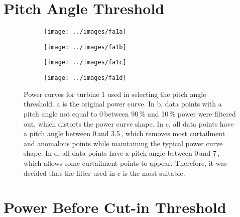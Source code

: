\chapter{Pitch Angle Threshold}\label{a1}

\begin{figure}
  \centering
  \begin{subfigure}[t]{.5\textwidth}
    \centering
    \texttt{[image: ../images/fa1a]}
    \caption{}
  \end{subfigure}
  \begin{subfigure}[t]{.5\textwidth}
    \centering
    \texttt{[image: ../images/fa1b]}
    \caption{}
  \end{subfigure}
  \begin{subfigure}[t]{.49\textwidth}
    \centering
    \texttt{[image: ../images/fa1c]}
    \caption{}
  \end{subfigure}
  \begin{subfigure}[t]{.49\textwidth}
    \centering
    \texttt{[image: ../images/fa1d]}
    \caption{}
  \end{subfigure}
  \captionsetup{labelformat=empty,list=no}
  \caption{Power curves for turbine 1 used in selecting the pitch angle
  threshold. a is the original power curve. In b, data points with a pitch
  angle not equal to 0\,\textdegree between 90\,\% and 10\,\% power were
  filtered out, which distorts the power curve shape. In c, all data points
  have a pitch angle between 0\,\textdegree and 3.5\,\textdegree, which
  removes most curtailment and anomalous points while maintaining the typical
  power curve shape. In d, all data points have a pitch angle between
  0\,\textdegree and 7\,\textdegree, which allows some curtailment points to
  appear. Therefore, it was decided that the filter used in c is the most
  suitable.}
\end{figure}

\chapter{Power Before Cut-in Threshold}\label{a2}


